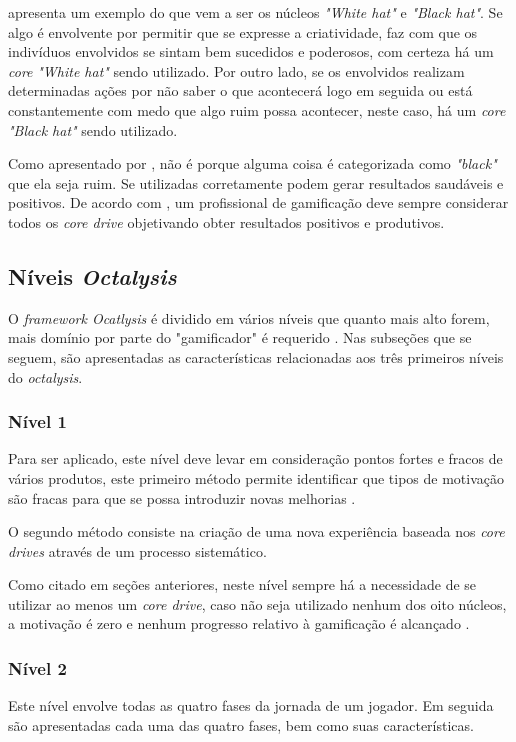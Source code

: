  apresenta um exemplo do que vem a ser os núcleos \textit{"White hat"} e \textit{"Black hat"}. Se algo é envolvente
por permitir que se expresse a criatividade, faz com que os indivíduos envolvidos se sintam bem sucedidos e poderosos, com certeza há um \textit{core} 
\textit{"White hat"} sendo utilizado. Por outro lado, se os envolvidos realizam determinadas ações por não saber o que acontecerá logo em seguida ou está
constantemente com medo que algo ruim possa acontecer, neste caso, há um \textit{core} \textit{"Black hat"} sendo utilizado.

Como apresentado por , não é porque alguma coisa é categorizada como \textit{"black"} que ela seja ruim. Se utilizadas
corretamente podem gerar resultados saudáveis e positivos. De acordo com , um profissional de gamificação deve sempre considerar
todos os \textit{core drive} objetivando obter resultados positivos e produtivos.


\subsection{Níveis \textit{Octalysis}}

O \textit{framework Ocatlysis} é dividido em vários níveis que quanto mais alto forem, mais domínio por parte do "gamificador" é requerido \cite{chou2017actionable}.
Nas subseções que se seguem, são apresentadas as características relacionadas aos três primeiros níveis do \textit{octalysis}.

\subsubsection{Nível 1}
Para ser aplicado, este nível deve levar em consideração pontos fortes e fracos de vários produtos, este primeiro método permite identificar
que tipos de motivação são fracas para que se possa introduzir novas melhorias \cite{chou2017actionable}.

O segundo método consiste na criação de uma nova experiência baseada nos \textit{core drives} através de um processo sistemático.

Como citado em seções anteriores, neste nível sempre há a necessidade de se utilizar ao menos um \textit{core drive}, caso não seja utilizado nenhum
dos oito núcleos, a motivação é zero e nenhum progresso relativo à gamificação é alcançado \cite{chou2017actionable}.

\subsubsection{Nível 2}
Este nível envolve todas as quatro fases da jornada de um jogador. Em seguida são apresentadas cada uma das quatro fases, bem como suas características.

